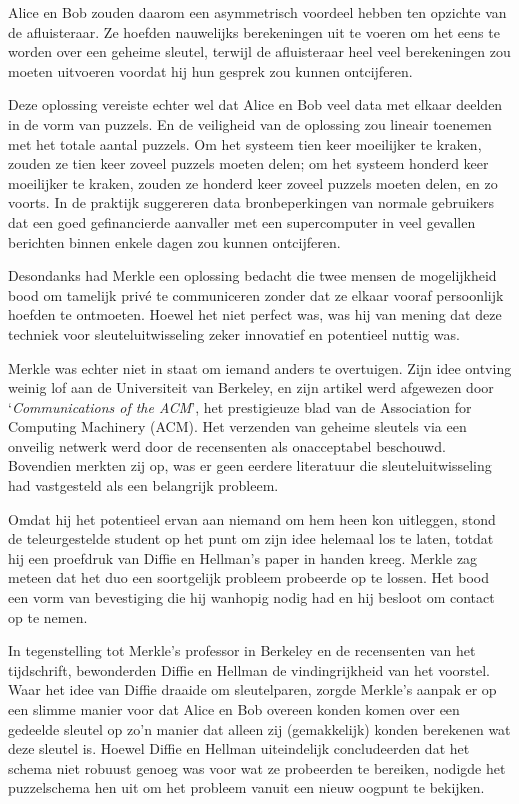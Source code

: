 \documentclass[
  a5paper,
  smalldemyvopaper,11pt,twoside,onecolumn,openright,extrafontsizes]{memoir}
\begin{document}
Alice en Bob zouden daarom een asymmetrisch voordeel hebben ten opzichte
van de afluisteraar. Ze hoefden nauwelijks berekeningen uit te voeren om
het eens te worden over een geheime sleutel, terwijl de afluisteraar
heel veel berekeningen zou moeten uitvoeren voordat hij hun gesprek zou
kunnen ontcijferen.

Deze oplossing vereiste echter wel dat Alice en Bob veel data met elkaar
deelden in de vorm van puzzels. En de veiligheid van de oplossing zou
lineair toenemen met het totale aantal puzzels. Om het systeem tien keer
moeilijker te kraken, zouden ze tien keer zoveel puzzels moeten delen;
om het systeem honderd keer moeilijker te kraken, zouden ze honderd keer
zoveel puzzels moeten delen, en zo voorts. In de praktijk suggereren
data bronbeperkingen van normale gebruikers dat een goed gefinancierde
aanvaller met een supercomputer in veel gevallen berichten binnen enkele
dagen zou kunnen ontcijferen.

Desondanks had Merkle een oplossing bedacht die twee mensen de
mogelijkheid bood om tamelijk privé te communiceren zonder dat ze elkaar
vooraf persoonlijk hoefden te ontmoeten. Hoewel het niet perfect was,
was hij van mening dat deze techniek voor sleuteluitwisseling zeker
innovatief en potentieel nuttig was.

Merkle was echter niet in staat om iemand anders te overtuigen. Zijn
idee ontving weinig lof aan de Universiteit van Berkeley, en zijn
artikel werd afgewezen door `\emph{Communications of the ACM}', het
prestigieuze blad van de Association for Computing Machinery (ACM). Het
verzenden van geheime sleutels via een onveilig netwerk werd door de
recensenten als onacceptabel beschouwd. Bovendien merkten zij op, was er
geen eerdere literatuur die sleuteluitwisseling had vastgesteld als een
belangrijk probleem.

Omdat hij het potentieel ervan aan niemand om hem heen kon uitleggen,
stond de teleurgestelde student op het punt om zijn idee helemaal los te
laten, totdat hij een proefdruk van Diffie en Hellman's paper in handen
kreeg. Merkle zag meteen dat het duo een soortgelijk probleem probeerde
op te lossen. Het bood een vorm van bevestiging die hij wanhopig nodig
had en hij besloot om contact op te nemen.

In tegenstelling tot Merkle's professor in Berkeley en de recensenten
van het tijdschrift, bewonderden Diffie en Hellman de vindingrijkheid
van het voorstel. Waar het idee van Diffie draaide om sleutelparen,
zorgde Merkle's aanpak er op een slimme manier voor dat Alice en Bob
overeen konden komen over een gedeelde sleutel op zo'n manier dat alleen
zij (gemakkelijk) konden berekenen wat deze sleutel is. Hoewel Diffie en
Hellman uiteindelijk concludeerden dat het schema niet robuust genoeg
was voor wat ze probeerden te bereiken, nodigde het puzzelschema hen uit
om het probleem vanuit een nieuw oogpunt te bekijken.
\end{document}
